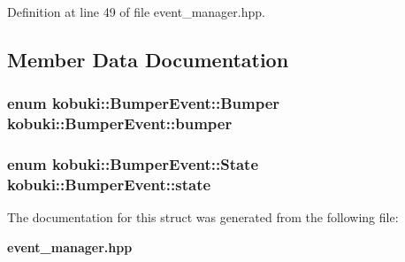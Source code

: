 \-Definition at line 49 of file event\-\_\-manager.\-hpp.



\subsection{\-Member \-Data \-Documentation}
\subsubsection[{bumper}]{\setlength{\rightskip}{0pt plus 5cm}enum {\bf kobuki\-::\-Bumper\-Event\-::\-Bumper}  {\bf kobuki\-::\-Bumper\-Event\-::bumper}}\label{structkobuki_1_1BumperEvent_af5950bf85bfbc384d36461e62848ba55}
\subsubsection[{state}]{\setlength{\rightskip}{0pt plus 5cm}enum {\bf kobuki\-::\-Bumper\-Event\-::\-State}  {\bf kobuki\-::\-Bumper\-Event\-::state}}\label{structkobuki_1_1BumperEvent_a6bb2ddaebf68b76924481952ccd8e732}


\-The documentation for this struct was generated from the following file\-:\begin{DoxyCompactItemize}
\item 
{\bf event\-\_\-manager.\-hpp}\end{DoxyCompactItemize}
